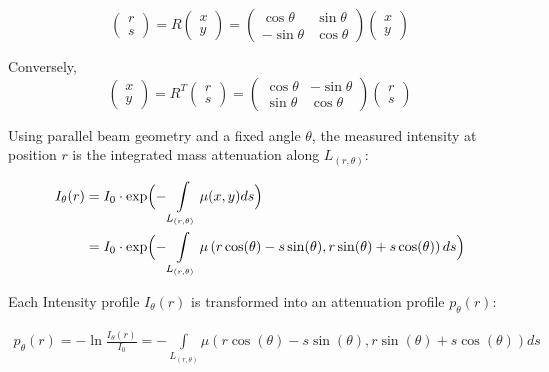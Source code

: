 \documentclass{article}
\begin{document}
$$\begin{pmatrix} r \\ s \end{pmatrix} = R \begin{pmatrix} x \\ y \end{pmatrix} = \begin{pmatrix} \cos\theta & \sin\theta \\ -\sin\theta & \cos\theta \end{pmatrix} \begin{pmatrix} x \\ y \end{pmatrix}$$

Conversely,
$$\begin{pmatrix} x \\ y \end{pmatrix} = R^T \begin{pmatrix} r \\ s \end{pmatrix} = \begin{pmatrix} \cos\theta & -\sin\theta \\ \sin\theta & \cos\theta \end{pmatrix} \begin{pmatrix} r \\ s \end{pmatrix}$$

Using parallel beam geometry and a fixed angle $\theta$, the measured intensity at position $r$ is the integrated mass attenuation  along $L_{(r,\theta)}$:

\begin{align}
I_{\theta}(r) &= I_0 \cdot \exp\Bigl({-\int\limits_{L_{(r,\theta)}} \mu (x,y) ds} \Bigr) \\
& = I_0 \cdot \exp\Bigl({-\int\limits_{L_{(r,\theta)}} \mu \left(r \cos(\theta) - s \sin(\theta),r \sin(\theta) + s \cos(\theta)\right) ds} \Bigr) 
\end{align}

Each Intensity profile $I_\theta (r)$ is transformed into an attenuation profile $p_\theta (r)$:

\begin{align}
p_\theta (r) = - \ln \frac{I_\theta (r)}{I_0} = -\int\limits_{L_{(r,\theta)}} \mu \left(r \cos(\theta) - s \sin(\theta),r \sin(\theta) + s \cos(\theta)\right) ds
\end{align}



\end{document}
